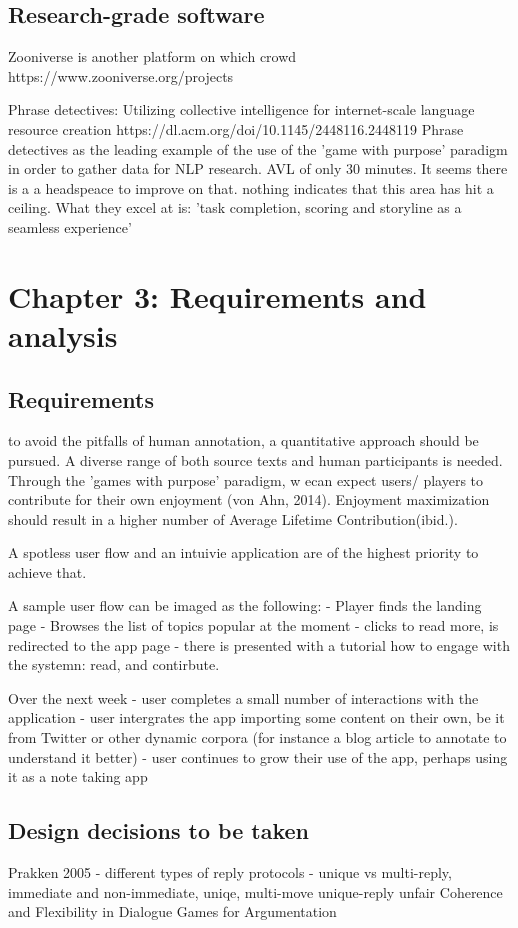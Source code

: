 \documentclass{article}
\begin{document}
\subsection{Research-grade software}

Zooniverse is another platform on which crowd
https://www.zooniverse.org/projects

Phrase detectives: Utilizing collective intelligence for internet-scale language resource creation
https://dl.acm.org/doi/10.1145/2448116.2448119
Phrase detectives as the leading example of the use of the 'game with purpose' paradigm in order to gather data for NLP research.
AVL of only 30 minutes. It seems there is a a headspeace to improve on that. nothing indicates that this area has hit a ceiling.
What they excel at is: 'task completion, scoring and storyline as a seamless experience'

\section{Chapter 3: Requirements and analysis}

\subsection{Requirements}
to avoid the pitfalls of human annotation, a quantitative approach should be pursued. 
A diverse range of both source texts and human participants is needed.
Through the 'games with purpose' paradigm, w ecan expect users/ players to contribute for their own enjoyment (von Ahn, 2014).
Enjoyment maximization should result in a higher number of Average Lifetime Contribution(ibid.).

A spotless user flow and an intuivie application are of the highest priority to achieve that.

A sample user flow can be imaged as the following:
- Player finds the landing page
- Browses the list of topics popular at the moment
- clicks to read more, is redirected to the app page
- there is presented with a tutorial how to engage with the systemn: read, and contirbute.

Over the next week
- user completes a small number of interactions with the application
- user intergrates the app importing some content on their own, be it from Twitter or other dynamic corpora (for instance a blog article to annotate to understand it better)
- user continues to grow their use of the app, perhaps using it as a note taking app


\subsection{Design decisions to be taken}
Prakken 2005 - different types of reply protocols - unique vs multi-reply, immediate and non-immediate, uniqe, multi-move
unique-reply unfair
Coherence and Flexibility in Dialogue Games for Argumentation 
\end{document}
